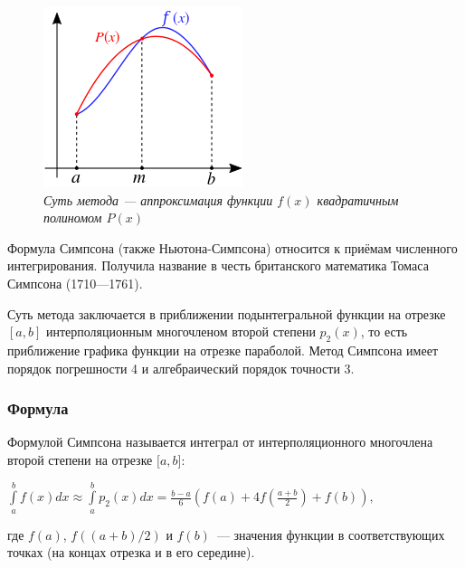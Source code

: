 \documentclass[a4paper]{article}
\begin{document}
{{{{{{{{\begin{figure}
\includegraphics[width=0.9\linewidth]{images/simpson.png}
\caption{\textit{Суть метода — аппроксимация функции $f(x)$ квадратичным полиномом $P(x)$}}
\label{fig:wrapfig}
\end{figure}

Формула Симпсона (также Ньютона-Симпсона) относится к приёмам численного интегрирования. Получила название в честь британского математика Томаса Симпсона (1710—1761).

Суть метода заключается в приближении подынтегральной функции на отрезке $[a,b]$ интерполяционным многочленом второй степени $p_2(x)$, то есть приближение графика функции на отрезке параболой. Метод Симпсона имеет порядок погрешности 4 и алгебраический порядок точности 3.

\subsubsection{Формула}

Формулой Симпсона называется интеграл от интерполяционного многочлена
второй степени на отрезке {{\(\lbrack a,b\rbrack\)}}:

\begin{center}
 {{\({\int\limits_{a}^{b}f(x)dx} \approx {\int\limits_{a}^{b}{p_{2}(x)}dx} = \frac{b - a}{6}\left( {f(a) + 4f\left( \frac{a + b}{2} \right) + f(b)} \right),\)}}
\end{center}

где {{\(f(a)\)}}, {{\(f((a + b)/2)\)}} и {{\(f(b)\)}}~--- значения
функции в соответствующих точках (на концах отрезка и в его середине).

}}}}}}}}
\end{document}
